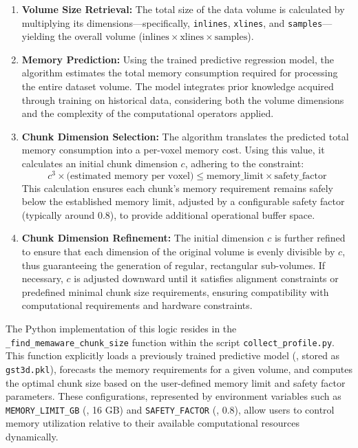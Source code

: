 \begin{enumerate}
    \item \textbf{Volume Size Retrieval:} The total size of the data volume is calculated by multiplying its dimensions—specifically, \texttt{inlines}, \texttt{xlines}, and \texttt{samples}—yielding the overall volume ($\text{inlines}\times \text{xlines}\times \text{samples}$).

    \item \textbf{Memory Prediction:} Using the trained predictive regression model, the algorithm estimates the total memory consumption required for processing the entire dataset volume. The model integrates prior knowledge acquired through training on historical data, considering both the volume dimensions and the complexity of the computational operators applied.

    \item \textbf{Chunk Dimension Selection:}
    The algorithm translates the predicted total memory consumption into a per-voxel memory cost.
    Using this value, it calculates an initial chunk dimension $c$, adhering to the constraint:
    \begin{equation}
        \label{eq:chunk_dimension_selection}
        c^3 \times \text{(estimated memory per voxel)} \leq \text{memory\_limit} \times \text{safety\_factor}
    \end{equation}
    This calculation ensures each chunk's memory requirement remains safely below the established memory limit, adjusted by a configurable safety factor (typically around 0.8), to provide additional operational buffer space.

    \item \textbf{Chunk Dimension Refinement:} The initial dimension $c$ is further refined to ensure that each dimension of the original volume is evenly divisible by $c$, thus guaranteeing the generation of regular, rectangular sub-volumes. If necessary, $c$ is adjusted downward until it satisfies alignment constraints or predefined minimal chunk size requirements, ensuring compatibility with computational requirements and hardware constraints.

\end{enumerate}

The Python implementation of this logic resides in the \texttt{\_find\_memaware\_chunk\_size} function within the script \texttt{collect\_profile.py}.
This function explicitly loads a previously trained predictive model (\eg, stored as \texttt{gst3d.pkl}), forecasts the memory requirements for a given volume, and computes the optimal chunk size based on the user-defined memory limit and safety factor parameters.
These configurations, represented by environment variables such as \texttt{MEMORY\_LIMIT\_GB} (\eg, 16 GB) and \texttt{SAFETY\_FACTOR} (\eg, 0.8), allow users to control memory utilization relative to their available computational resources dynamically.

